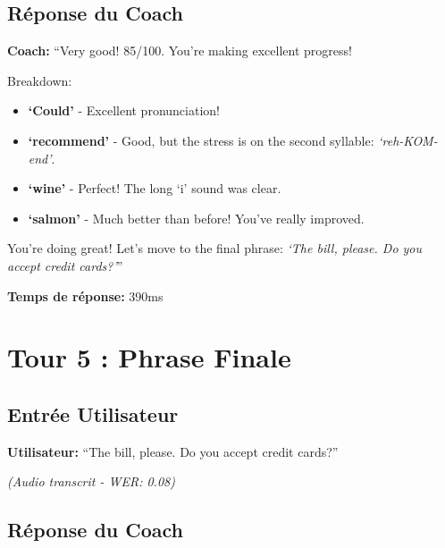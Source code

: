 \documentclass[12pt,a4paper,oneside]{report}
\begin{document}
\subsection{Réponse du Coach}

\begin{tcolorbox}[colback=coachgreen!10, colframe=coachgreen, title=Coach IA - Analyse Complète]
\textbf{Coach:} ``Very good! 85/100. You're making excellent progress!

Breakdown:
\begin{itemize}
    \item \textbf{`Could'} - Excellent pronunciation!
    \item \textbf{`recommend'} - Good, but the stress is on the second syllable: \textit{`reh-KOM-end'}.
    \item \textbf{`wine'} - Perfect! The long `i' sound was clear.
    \item \textbf{`salmon'} - Much better than before! You've really improved.
\end{itemize}

You're doing great! Let's move to the final phrase: \textit{`The bill, please. Do you accept credit cards?'}''
\end{tcolorbox}

\vspace{0.5cm}

\textbf{Temps de réponse:} 390ms

\section{Tour 5 : Phrase Finale}

\subsection{Entrée Utilisateur}

\begin{tcolorbox}[colback=userblue!10, colframe=userblue, title=Utilisateur - Tentative 5]
\textbf{Utilisateur:} ``The bill, please. Do you accept credit cards?''

\textit{(Audio transcrit - WER: 0.08)}
\end{tcolorbox}

\subsection{Réponse du Coach}
\end{document}
